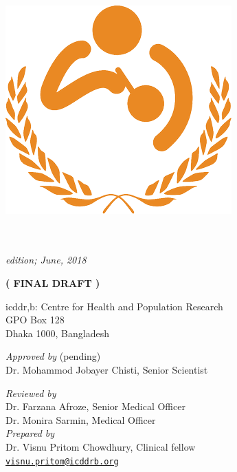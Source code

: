 \documentclass[11pt,a4paper]{report}
\begin{document}
\setcounter{secnumdepth}{3}
\setcounter{tocdepth}{1}

\begin{titlepage}
	\centering 
	~\\
	\vspace{1.5cm}
	
	\includegraphics[scale=0.30]{icddrb.png}
	
	\vspace{2.0cm}
	{} \\
	\vspace{3mm}
	{} \\
	\vspace{3mm}
	\textit{ edition; June, 2018}
	
	\vspace{1.5cm}
	\textbf{{\color{red}( FINAL DRAFT )}}

	
	\vspace{1.5cm}
	{\Large icddr,b: Centre for Health and Population Research} \\
	GPO Box 128 \\
	Dhaka 1000, Bangladesh 
	
	\vspace{1.75cm}
{\large \textit{Approved by}} {\color{red}(pending)} \\
	{\large Dr. Mohammod Jobayer Chisti, Senior Scientist}

\vspace{5.00mm}
{\large \textit{Reviewed by}} \\
	{\large Dr. Farzana Afroze}, Senior Medical Officer \\
	{\large Dr. Monira Sarmin}, Medical Officer \\

\vspace{5.00mm}
{\large \textit{Prepared by}} \\
	{\large Dr. Visnu Pritom Chowdhury}, Clinical fellow \\
	\href{mailto:pr3370m@gmail.com}{\texttt{visnu.pritom@icddrb.org}}
\end{titlepage}
\end{document}
